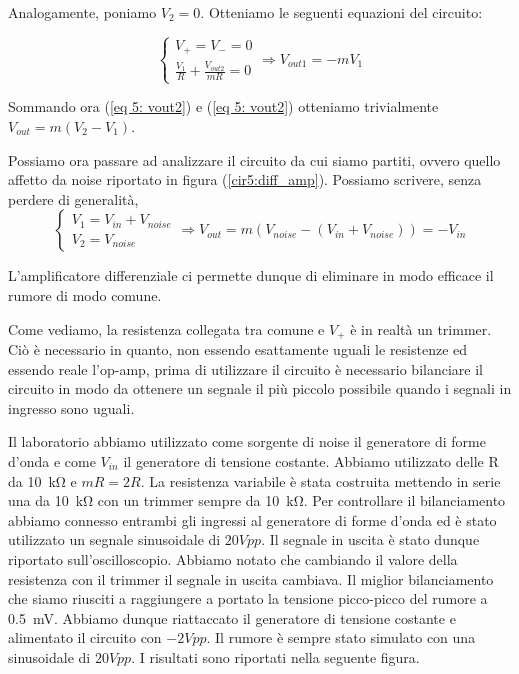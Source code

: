Analogamente, poniamo $V_2=0$. Otteniamo le seguenti equazioni del circuito:

\begin{equation}
\begin{cases} V_+=V_-=0  \\ \frac{V_1}{R}+\frac{V_{out2}}{mR}=0 \end{cases}  \Rightarrow V_{out1}=-mV_1
\label{eq 5: vout1}
\end{equation}

Sommando ora (\ref{eq 5: vout2}) e (\ref{eq 5: vout2}) otteniamo trivialmente $V_{out}=m(V_2-V_1)$.

Possiamo ora passare ad analizzare il circuito da cui siamo partiti, ovvero quello affetto da noise riportato in figura (\ref{cir5:diff_amp}). Possiamo scrivere, senza perdere di generalità,
$$
\begin{cases} V_1=V_{in}+V_{noise} \\ V_2=V_{noise} \end{cases}  \Rightarrow V_{out}=m(V_{noise}-(V_{in}+V_{noise}))=-V_{in}
$$

L'amplificatore differenziale ci permette dunque di eliminare in modo efficace il rumore di modo comune. 

Come vediamo, la resistenza collegata tra comune e $V_+$ è in realtà un trimmer. Ciò è necessario in quanto, non essendo esattamente uguali le resistenze ed essendo reale l'op-amp, prima di utilizzare il circuito è necessario bilanciare il circuito in modo da ottenere un segnale il più piccolo possibile quando i segnali in ingresso sono uguali. 

Il laboratorio abbiamo utilizzato come sorgente di noise il generatore di forme d'onda e come $V_{in}$ il generatore di tensione costante. Abbiamo utilizzato delle R da \SI{10}{\kilo\ohm} e $mR=2R$. La resistenza variabile è stata costruita mettendo in serie una da \SI{10}{\kilo\ohm} con un trimmer sempre da \SI{10}{\kilo\ohm}. Per controllare il bilanciamento abbiamo connesso entrambi gli ingressi al generatore di forme d'onda ed è stato utilizzato un segnale sinusoidale di $20Vpp$. Il segnale in uscita è stato dunque riportato sull'oscilloscopio. Abbiamo notato che cambiando il valore della resistenza con il trimmer il segnale in uscita cambiava. Il miglior bilanciamento che siamo riusciti a raggiungere a portato la tensione picco-picco del rumore a \SI{0.5}{\milli\volt}. Abbiamo dunque riattaccato il generatore di tensione costante e alimentato il circuito con $-2Vpp$. Il rumore è sempre stato simulato con una sinusoidale di $20Vpp$. I risultati sono riportati nella seguente figura.

